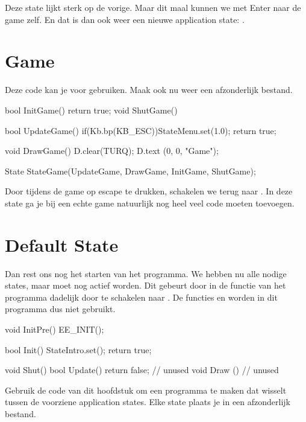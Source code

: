 Deze state lijkt sterk op de vorige. Maar dit maal kunnen we met Enter naar de game zelf. En dat is dan ook weer een nieuwe application state: .

\section{Game}
Deze code kan je voor  gebruiken. Maak ook nu weer een afzonderlijk bestand.
\begin{code}
bool InitGame() {return true;}
void ShutGame() {}

bool UpdateGame()
{
   if(Kb.bp(KB_ESC))StateMenu.set(1.0);
   return true;
}

void DrawGame()
{
   D.clear(TURQ);
   D.text (0, 0, "Game");
}

State StateGame(UpdateGame, DrawGame, InitGame, ShutGame);
\end{code}

Door tijdens de game op escape te drukken, schakelen we terug naar . In deze state ga je bij een echte game natuurlijk nog heel veel code moeten toevoegen.

\section{Default State}
Dan rest ons nog het starten van het programma. We hebben nu alle nodige states, maar  moet nog actief worden. Dit gebeurt door in de  functie van het programma dadelijk door te schakelen naar . De functies  en  worden in dit programma dus niet gebruikt.

\begin{code}
void InitPre()
{
   EE_INIT();
}

bool Init()
{
   StateIntro.set();
   return true;
}

void Shut() {}
bool Update() {return false;} // unused
void Draw  () {             } // unused
\end{code}

\begin{exercise}
Gebruik de code van dit hoofdstuk om een programma te maken dat wisselt tussen de voorziene application states. Elke state plaats je in een afzonderlijk bestand.
\end{exercise}